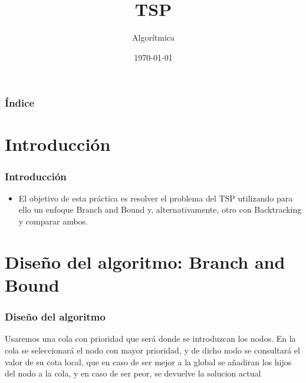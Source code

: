 \documentclass{beamer}
\title[Práctica 4]{TSP} %
\author{Algorítmica} %
\institute[UGR] %
{
	Universidad de Granada \\ %
	\medskip
	
}
\date{\today} %
\begin{document}
	
	\begin{frame}
		\titlepage %
	\end{frame}
	
	\begin{frame}
		\frametitle{Índice} %
		\tableofcontents %
	\end{frame}
	
	
	\section{Introducción }
	\begin{frame}
		\frametitle{Introducción}
		\begin{itemize}
			\item El objetivo de esta práctica es resolver el problema del TSP utilizando para ello un enfoque Branch and Bound y, alternativamente, otro con Backtracking y comparar ambos.
		\end{itemize}
	\end{frame}
	
	

\section{Diseño del algoritmo: Branch and Bound} 
\begin{frame}
	\frametitle{Diseño del algoritmo}
	
	Usaremos una cola con prioridad que será donde se introduzcan los nodos.
	En la cola se seleccionará el nodo con mayor prioridad, y de dicho nodo se consultará el valor de su cota local, que en caso de ser mejor a la global se añadiran los hijos del nodo a la cola, y en caso de ser peor, se devuelve la solucion actual
	
	
\end{frame}	
\end{document}

